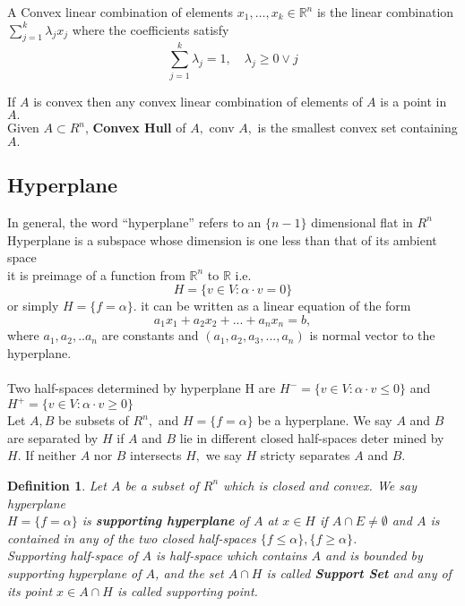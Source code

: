 \documentclass[oneside]{book}
\newtheorem{mydef}{Definition}
\begin{document}
 A Convex linear combination of elements $x_{1}, \ldots, x_{k} \in \mathbb{R}^{n}$ is the
linear combination
$
\sum_{j=1}^{k} \lambda_{j} x_{j}
$
where the coefficients satisfy
$$
\sum_{j=1}^{k} \lambda_{j}=1, \quad \lambda_{j} \geq 0 \vee j
$$


If $A$ is convex then any convex linear combination of elements
of $A$ is a point in $A .$\\

 
 
 Given $A \subset R^{n}$, \textbf{Convex Hull} of $A,$ conv $A,$ is the smallest
convex set containing $A .$


 \subsection{Hyperplane} 
 In general, the word “hyperplane” refers to an $\{n-1\}$ dimensional flat in $R^{n}$ \\
 Hyperplane is a subspace whose dimension is one less than that of its ambient space  
 \\ it is preimage of a function from $\mathbb{R}^{n}$ to $\mathbb{R}$ i.e.
 \begin{equation}
   H=\{v \in V: \alpha \cdot v=0\} 
  \end{equation}  
    or simply  $H = \{f = \alpha \}$. 
   it can be written    as  a linear equation of the form
$$a_1x_1 + a_2x_2 + ... + a_nx_n = b,$$ where $a_1,a_2,..a_n$ are constants and $(a_1,a_2,a_3,...,a_n)$ is normal vector to the hyperplane.
\\\\
 Two half-spaces  determined by hyperplane H are 
$H^{-}=\{v \in V: \alpha \cdot v \leq 0\}$ and  $ H^{+}=\{v \in V: \alpha \cdot v \geq 0\} $ 
\\
Let $A, B$ be subsets of $R^{n},$ and $H=\{f=\alpha\}$ be a hyperplane. We say $A$ and
$B$ are separated by $H$ if $A$ and $B$ lie in different closed half-spaces deter
mined by $H .$ If neither $A$ nor $B$ intersects $H,$ we say $H$ stricty separates $A$
and $B .$\\

\begin{mydef}
Let $A$ be a subset of $R^{n}$ which is closed and convex. We say hyperplane \\ $H=\{f=\alpha\}$ is \textbf{supporting hyperplane} of $A$ at  $x \in H$  if $A \cap E \neq \emptyset$ and $A$ is contained in any of the two closed half-spaces $\{f \leq \alpha\}, \{f \geq \alpha\}$.
\\
    Supporting half-space of $A$ is half-space which contains $A$ and is bounded by supporting hyperplane of $A$, and the set $A \cap H$ is called \textbf{Support Set} and any of its point $x \in A \cap H$ is called supporting point.
\end{mydef}
\end{document}
